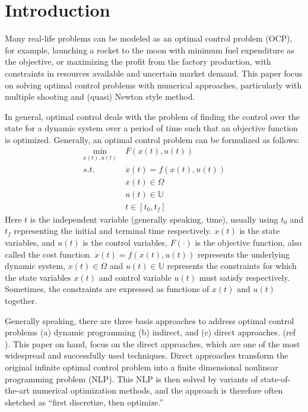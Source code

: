 \documentclass  [
  paper    = a4,
  BCOR     = 10mm,
  twoside,
  fontsize = 12pt,
  fleqn,
  toc      = bibnumbered,
  toc      = listofnumbered,
  numbers  = noendperiod,
  headings = normal,
  listof   = leveldown,
  version  = 3.03
]                                       {scrreprt}
\newcommand{\<}{\langle}
\renewcommand{\>}{\rangle}
\begin{document}
   
   \tableofcontents
    \let\clearpage\relax
   \newpage
   
   
 \chapter{Introduction}  
 \label{Chapter1}
Many real-life problems can be modeled as an optimal control problem (OCP), for example, launching a rocket to the moon with minimum fuel expenditure as the objective, or maximizing the profit from the factory production, with constraints in resources available and uncertain market demand. This paper focus on solving optimal control problems with numerical approaches, particularly with multiple shooting and (quasi) Newton style method. 

In general, optimal control deals with the problem of finding the control over the state for a dynamic system over a period of time such that an objective function is optimized. Generally, an optimal control problem can be formulized as follows: 
      \begin{equation}
   	\begin{aligned}
   	\underset{x(t), u(t)}{\text{min}}  \ &  F(x(t), u(t)) \\
   		s.t.\ \  &  \dot{x} (t) = f(x(t), u(t))\\ 
   		        & x(t) \in \Omega \\
   		          & u(t) \in \mathbb{U}  \\
   		          & t \in [t_0, t_f]
   	\end{aligned}
   	\label{P1_OPH}
   \end{equation}
 Here $t$ is the independent variable (generally speaking, time), usually using $t_0$ and $t_f$ representing the initial and terminal time respectively. $x(t)$ is the state variables, and $u(t)$ is the control variables, $F(\cdot)$ is the objective function, also called the cost function. $\dot{x} (t) = f(x(t), u(t))$ represents the underlying dynamic system,  $x(t) \in \Omega$ and  $ u(t) \in \mathbb{U}$ represents the constraints for which the state variables $x(t)$ and control variable $u(t)$ must satisfy respectively.  Sometimes, the constraints are expressed as functions of $x(t)$ and $u(t)$ together. 
 

Generally speaking, there are three basis approaches to address optimal control problems (a) dynamic programming (b) indirect, and (c) direct approaches. (ref \cite{MHHP05}). This paper on hand, focus on the direct approaches, which are one of the most widespread and successfully used techniques. Direct approaches transform the original infinite optimal control problem into a finite dimensional nonlinear programming problem (NLP). This NLP is then solved by variants of state-of-the-art numerical optimization methods, and the approach is therefore often sketched as “first discretize, then optimize.” 
\end{document}
